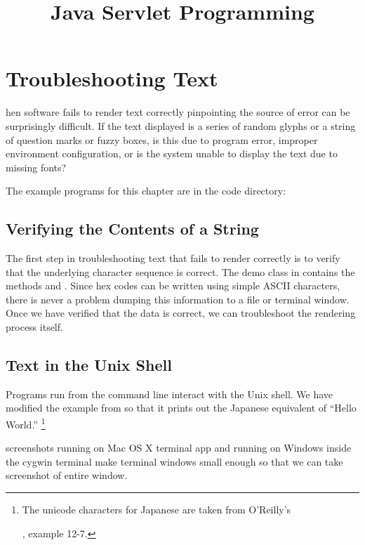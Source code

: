 \chapter{Troubleshooting Text}\label{chap:text-trouble}

hen software fails to render text correctly
pinpointing the source of error can be surprisingly difficult.
If the text displayed is a series of random glyphs or a string of
question marks or fuzzy boxes, is this due to program error,
improper environment configuration, or is the system unable to
display the text due to missing fonts?

The example programs for this chapter are in the code directory:
%

\section{Verifying the Contents of a String}

The first step in troubleshooting text that fails to render correctly
is to verify that the underlying character sequence is correct.
The demo class  in 
contains the methods 
  and .
%
%
Since hex codes can be written using simple ASCII characters,
there is never a problem dumping this information to a file or
terminal window.
Once we have verified that the data is correct, we can
troubleshoot the rendering process itself.

\section{Text in the Unix Shell}

Programs run from the command line interact with the Unix shell.
We have modified the  example from 
so that it prints out the Japanese equivalent of ``Hello World.''%
%
\footnote{The unicode characters for Japanese are taken from
O'Reilly's \title{Java Servlet Programming}, example 12-7.}
%
%

screenshots running on Mac OS X terminal app
and running on Windows inside the cygwin terminal
make terminal windows small enough so that we can take screenshot
of entire window.

